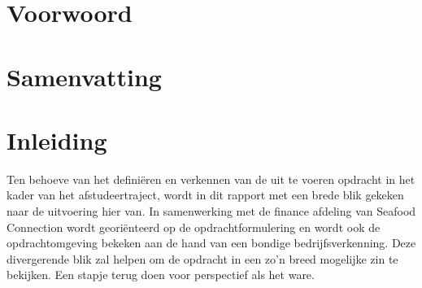 \documentclass[10pt,a4paper,twoside]{report}
\begin{document}
\chapter*{Voorwoord}
\thispagestyle{empty}
\BgThispage
\lipsum[1]


\chapter*{Samenvatting}
\thispagestyle{empty}
\lipsum[1-4]

\setcounter{page}{4} %
\tableofcontents
\thispagestyle{empty}

\chapter*{Inleiding}
Ten behoeve van het definiëren en verkennen van de uit te voeren opdracht in het kader van het afstudeertraject, wordt in dit rapport met een brede blik gekeken naar de uitvoering hier van. In samenwerking met de finance afdeling van Seafood Connection wordt georiënteerd op de opdrachtformulering en wordt ook de opdrachtomgeving bekeken aan de hand van een bondige bedrijfsverkenning. Deze divergerende blik zal helpen om de opdracht in een zo’n breed mogelijke zin te bekijken. Een stapje terug doen voor perspectief als het ware.
\end{document}
